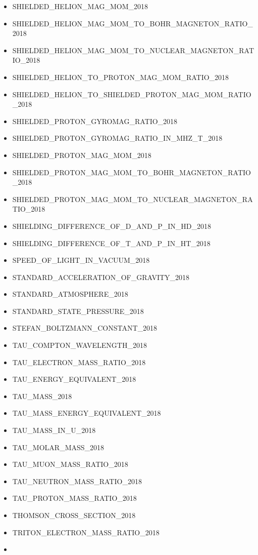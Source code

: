 \begin{itemize}
  SHIELDED\_HELION\_GYROMAG\_RATIO\_IN\_MHZ\_T\_2018
\item
  SHIELDED\_HELION\_MAG\_MOM\_2018
\item
  SHIELDED\_HELION\_MAG\_MOM\_TO\_BOHR\_MAGNETON\_RATIO\_2018
\item
  SHIELDED\_HELION\_MAG\_MOM\_TO\_NUCLEAR\_MAGNETON\_RATIO\_2018
\item
  SHIELDED\_HELION\_TO\_PROTON\_MAG\_MOM\_RATIO\_2018
\item
  SHIELDED\_HELION\_TO\_SHIELDED\_PROTON\_MAG\_MOM\_RATIO\_2018
\item
  SHIELDED\_PROTON\_GYROMAG\_RATIO\_2018
\item
  SHIELDED\_PROTON\_GYROMAG\_RATIO\_IN\_MHZ\_T\_2018
\item
  SHIELDED\_PROTON\_MAG\_MOM\_2018
\item
  SHIELDED\_PROTON\_MAG\_MOM\_TO\_BOHR\_MAGNETON\_RATIO\_2018
\item
  SHIELDED\_PROTON\_MAG\_MOM\_TO\_NUCLEAR\_MAGNETON\_RATIO\_2018
\item
  SHIELDING\_DIFFERENCE\_OF\_D\_AND\_P\_IN\_HD\_2018
\item
  SHIELDING\_DIFFERENCE\_OF\_T\_AND\_P\_IN\_HT\_2018
\item
  SPEED\_OF\_LIGHT\_IN\_VACUUM\_2018
\item
  STANDARD\_ACCELERATION\_OF\_GRAVITY\_2018
\item
  STANDARD\_ATMOSPHERE\_2018
\item
  STANDARD\_STATE\_PRESSURE\_2018
\item
  STEFAN\_BOLTZMANN\_CONSTANT\_2018
\item
  TAU\_COMPTON\_WAVELENGTH\_2018
\item
  TAU\_ELECTRON\_MASS\_RATIO\_2018
\item
  TAU\_ENERGY\_EQUIVALENT\_2018
\item
  TAU\_MASS\_2018
\item
  TAU\_MASS\_ENERGY\_EQUIVALENT\_2018
\item
  TAU\_MASS\_IN\_U\_2018
\item
  TAU\_MOLAR\_MASS\_2018
\item
  TAU\_MUON\_MASS\_RATIO\_2018
\item
  TAU\_NEUTRON\_MASS\_RATIO\_2018
\item
  TAU\_PROTON\_MASS\_RATIO\_2018
\item
  THOMSON\_CROSS\_SECTION\_2018
\item
  TRITON\_ELECTRON\_MASS\_RATIO\_2018
\item

\end{itemize}
